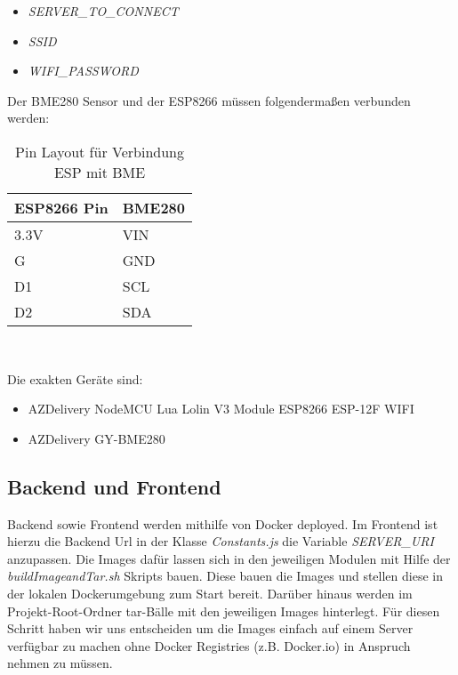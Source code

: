 \begin{itemize}
	\item \textit{SERVER\_TO\_CONNECT}
	\item \textit{SSID}
	\item \textit{WIFI\_PASSWORD}
\end{itemize}

Der BME280 Sensor und der ESP8266 müssen folgendermaßen verbunden werden:

\begin{table}[hbt]
	\centering
	\begin{minipage}[t]{.5\textwidth}
		\caption{Pin Layout für Verbindung ESP mit BME}
	\begin{tabular}{|l|l|}
		\hline
		\textbf{ESP8266 Pin}	& \textbf{BME280}  \\
		\hline
		3.3V & VIN \\
		\hline
		G & GND \\
		\hline
		D1 & SCL \\
		\hline
		D2 & SDA \\
		\hline
	\end{tabular}
	\\
\label{tab:espBmePinout}
\end{minipage}
\end{table}

Die exakten Geräte sind:

\begin{itemize}
    \item AZDelivery NodeMCU Lua Lolin V3 Module ESP8266 ESP-12F WIFI
    \item AZDelivery GY-BME280
\end{itemize}

\subsection{Backend und Frontend}

Backend sowie Frontend werden mithilfe von Docker deployed.
Im Frontend ist hierzu die Backend Url in der Klasse \textit{Constants.js} die Variable \textit{SERVER\_URI} anzupassen.
Die Images dafür lassen sich in den jeweiligen Modulen mit Hilfe der \textit{buildImageandTar.sh} Skripts bauen.
Diese bauen die Images und stellen diese in der lokalen Dockerumgebung zum Start bereit.
Darüber hinaus werden im Projekt-Root-Ordner tar-Bälle mit den jeweiligen Images hinterlegt.
Für diesen Schritt haben wir uns entscheiden um die Images einfach auf einem Server verfügbar zu machen ohne Docker Registries (z.B. Docker.io) in Anspruch nehmen zu müssen.

